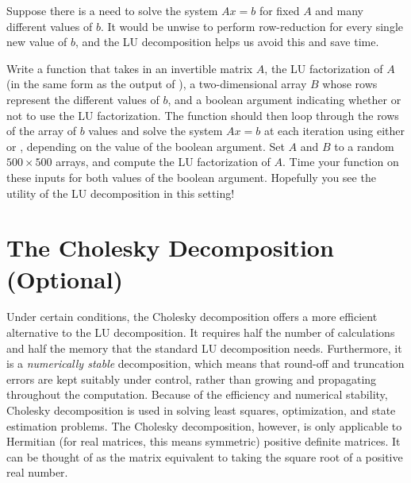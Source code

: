 \begin{problem}
\label{prob:loopSolve}
Suppose there is a need to solve the system $Ax = b$ for fixed $A$ and many 
different values of $b$. It would be unwise to perform row-reduction for 
every single new value of $b$, and the LU decomposition helps us avoid this 
and save time. 

Write a function that takes in an invertible matrix $A$, the LU factorization
of $A$ (in the same form as the output of ),
a two-dimensional array $B$ whose rows represent the different values of $b$,
and a boolean argument indicating whether or not to use the LU factorization.
The function should then loop through the rows of the array of $b$ values
and solve the system $Ax = b$ at each iteration using either  or , depending on the value of
the boolean argument.
Set $A$ and $B$ to a random $500 \times 500$ arrays, and compute the LU
factorization of $A$. Time your function on these inputs for both values of
the boolean argument. Hopefully you see the utility of the LU decomposition
in this setting!
\end{problem}

%

\section*{The Cholesky Decomposition (Optional)}

Under certain conditions, the Cholesky decomposition offers a more efficient alternative to the LU decomposition.
It requires half the number of calculations and half the memory that the standard LU decomposition needs.
Furthermore, it is a \emph{numerically stable} decomposition, which means that round-off and truncation errors are kept suitably under control, rather than growing and propagating throughout the computation.
Because of the efficiency and numerical stability, Cholesky decomposition is used in solving least squares, optimization, and state estimation problems.
The Cholesky decomposition, however, is only applicable to Hermitian (for real matrices, this means symmetric) positive definite matrices.
It can be thought of as the matrix equivalent to taking the square root of a positive real number.

